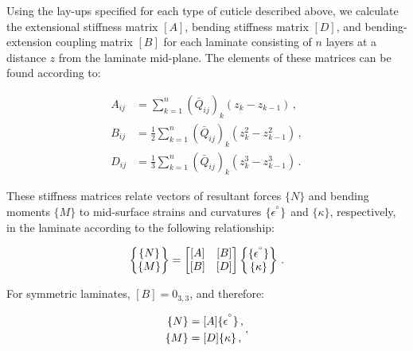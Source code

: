 \documentclass[twocolumn, linenumbers, superscriptaddress, nofootinbib]{revtex4-1}
\begin{document}
				Using the lay-ups specified for each type of cuticle described above, we calculate the extensional stiffness matrix $[A]$, bending stiffness matrix $[D]$, and bending-extension coupling matrix $[B]$ for each laminate consisting of $n$ layers at a distance $z$ from the laminate mid-plane.
				The elements of these matrices can be found according to:
				
				\begin{equation}
					\begin{aligned}
						A_{ij} & = \sum_{k = 1}^{n}(\bar{Q}_{ij})_k(z_{k} - z_{k-1})\,, \\
						B_{ij} & = \frac{1}{2}\sum_{k = 1}^{n}(\bar{Q}_{ij})_k(z^2_{k} - z^2_{k-1})\,, \\
						D_{ij} & = \frac{1}{3}\sum_{k = 1}^{n}(\bar{Q}_{ij})_k(z^3_{k} - z^3_{k-1})\,.
					\end{aligned}
				\end{equation}
				
				These stiffness matrices relate vectors of resultant forces $\{N\}$ and bending moments $\{M\}$ to mid-surface strains and curvatures $\{\epsilon^{\degree}\}$ and $\{\kappa\}$, respectively, in the laminate according to the following relationship:
				
				\begin{equation}
					\begin{Bmatrix}
						\{N\} \\
						\{M\}
					\end{Bmatrix}
					=
					\begin{bmatrix}
						[A] & [B] \\
						[B] & [D]
					\end{bmatrix}
					\begin{Bmatrix}
					\{\epsilon^{\degree}\} \\
					\{\kappa\}
					\end{Bmatrix}\,.
				\end{equation}
				
				For symmetric laminates, $[B] = 0_{3,3}$, and therefore:
				
				\begin{equation}
				\label{eqn::abbd}
					\begin{aligned}
						\{N\} & = [A]\{\epsilon^{\degree}\}\,, \\
						\{M\} & = [D]\{\kappa\}\,,						
					\end{aligned}\,,
				\end{equation}
				
\end{document}
